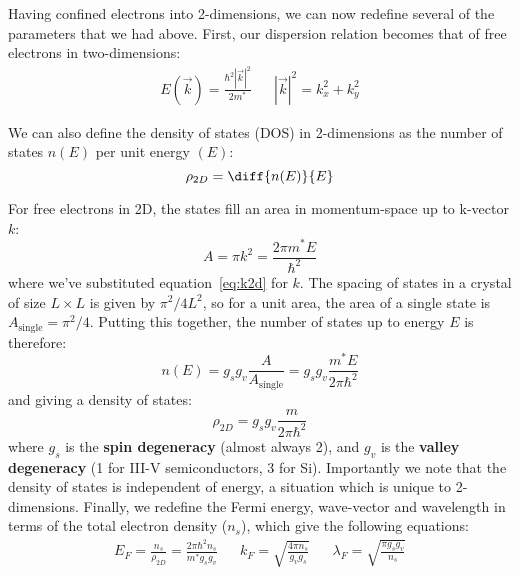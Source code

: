 Having confined electrons into 2-dimensions, we can now redefine several of the parameters that we had above. First, our
dispersion relation becomes that of free electrons in two-dimensions:
\begin{align}
  E(\vec{k}) = \frac{\hbar^2 |\vec{k}|^2}{2m^*} && |\vec{k}|^2 = k_x^2 + k_y^2
  \label{eq:k2d}
\end{align}

We can also define the density of states (DOS) in 2-dimensions as the number of states $n(E)$ per unit energy $(E)$:
\begin{equation}
  \rho_{2D} = \diff{n(E)}{E}
\end{equation}

For free electrons in 2D, the states fill an area in momentum-space up to k-vector $k$:
\begin{equation}
  A = \pi k^2 = \frac{2 \pi m^* E}{\hbar^2}
\end{equation}
where we've substituted equation~\ref{eq:k2d} for $k$. The spacing of states in a crystal of size $L \times L$ is given
by $\pi^2/4 L^2$, so for a unit area, the area of a single state is $A_{\textrm{single}} = \pi^2/4$. Putting this together,
the number of states up to energy $E$ is therefore:
\begin{equation}
  n(E) = g_s g_v \frac{A}{A_{\textrm{single}}} = g_s g_v \frac{m^* E}{2 \pi \hbar^2}
\end{equation}
and giving a density of states:
\begin{equation}
  \rho_{2D} = g_s g_v \frac{m}{2 \pi \hbar^2}
\end{equation}
where $g_s$ is the \textbf{spin degeneracy} (almost always 2), and $g_v$ is the \textbf{valley degeneracy} (1 for III-V semiconductors, 3 for Si).
Importantly we note that the density of states is independent of energy, a situation which is unique to 2-dimensions.
Finally, we redefine the Fermi energy, wave-vector and wavelength in terms of the total electron density ($n_s$), which give the following equations:
\begin{align}
  E_F = \frac{n_s}{\rho_{2D}} = \frac{2 \pi \hbar^2 n_s}{m^* g_s g_v} &&
  k_F = \sqrt{\frac{4 \pi n_s}{g_v g_s}} &&
  \lambda_F = \sqrt{\frac{\pi g_s g_v}{n_s}}
\end{align}

